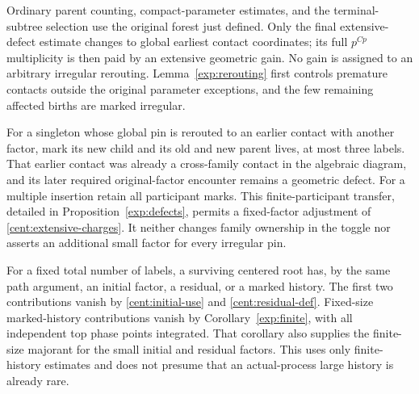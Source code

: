 \begin{remark}\label{cent:pin-forest}
Ordinary parent counting, compact-parameter estimates, and the
terminal-subtree selection use the original forest just defined.
Only the final extensive-defect estimate changes to global earliest
contact coordinates; its full $p^{Cp}$ multiplicity is then paid by
an extensive geometric gain. No gain is assigned to an arbitrary
irregular rerouting. Lemma~\ref{exp:rerouting} first controls premature
contacts outside the original parameter exceptions, and the few
remaining affected births are marked irregular.

For a singleton whose global pin is rerouted to an earlier contact
with another factor, mark its new child and its old and new parent
lives, at most three labels. That earlier contact was already a
cross-family contact in the algebraic diagram, and its later
required original-factor encounter remains a geometric defect.
For a multiple insertion retain all participant marks. This
finite-participant transfer, detailed in Proposition~\ref{exp:defects},
permits a fixed-factor adjustment of \eqref{cent:extensive-charges}.
It neither changes family ownership in the toggle nor asserts an
additional small factor for every irregular pin.
\end{remark}

For a fixed total number of labels, a surviving centered root has,
by the same path argument, an initial factor, a residual, or a marked
history. The first two contributions vanish by
\eqref{cent:initial-use} and \eqref{cent:residual-def}. Fixed-size
marked-history contributions vanish by Corollary~\ref{exp:finite},
with all independent top phase points integrated. That corollary
also supplies the finite-size majorant for the small initial and
residual factors. This uses only finite-history estimates and does
not presume that an actual-process large history is already rare.
